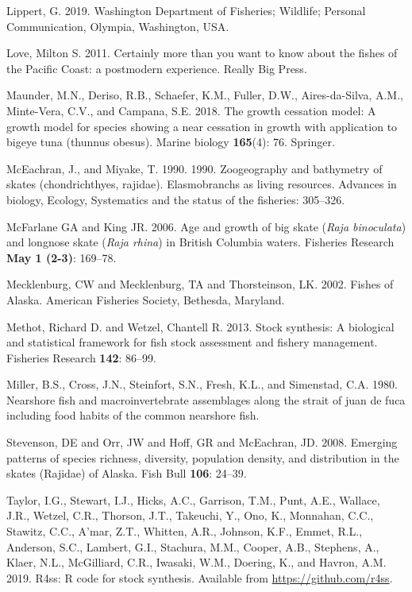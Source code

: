 \documentclass[12pt,]{article}
\begin{document}
\leavevmode\hypertarget{ref-GregLippert}{}%
Lippert, G. 2019. Washington Department of Fisheries; Wildlife; Personal
Communication, Olympia, Washington, USA.

\leavevmode\hypertarget{ref-Love2011}{}%
Love, Milton S. 2011. Certainly more than you want to know about the
fishes of the Pacific Coast: a postmodern experience. Really Big Press.

\leavevmode\hypertarget{ref-maunder2018growth}{}%
Maunder, M.N., Deriso, R.B., Schaefer, K.M., Fuller, D.W.,
Aires-da-Silva, A.M., Minte-Vera, C.V., and Campana, S.E. 2018. The
growth cessation model: A growth model for species showing a near
cessation in growth with application to bigeye tuna (thunnus obesus).
Marine biology \textbf{165}(4): 76. Springer.

\leavevmode\hypertarget{ref-McEachran1990}{}%
McEachran, J., and Miyake, T. 1990. 1990. Zoogeography and bathymetry of
skates (chondrichthyes, rajidae). Elasmobranchs as living resources.
Advances in biology, Ecology, Systematics and the status of the
fisheries: 305--326.

\leavevmode\hypertarget{ref-McFandKing2006}{}%
McFarlane GA and King JR. 2006. Age and growth of big skate (\emph{Raja
binoculata}) and longnose skate (\emph{Raja rhina}) in British Columbia
waters. Fisheries Research \textbf{May 1 (2-3)}: 169--78.

\leavevmode\hypertarget{ref-Mecklenburg2002}{}%
Mecklenburg, CW and Mecklenburg, TA and Thorsteinson, LK. 2002. Fishes
of Alaska. American Fisheries Society, Bethesda, Maryland.

\leavevmode\hypertarget{ref-Methot2013}{}%
Methot, Richard D. and Wetzel, Chantell R. 2013. Stock synthesis: A
biological and statistical framework for fish stock assessment and
fishery management. Fisheries Research \textbf{142}: 86--99.

\leavevmode\hypertarget{ref-Miller1980}{}%
Miller, B.S., Cross, J.N., Steinfort, S.N., Fresh, K.L., and Simenstad,
C.A. 1980. Nearshore fish and macroinvertebrate assemblages along the
strait of juan de fuca including food habits of the common nearshore
fish.

\leavevmode\hypertarget{ref-Stevenson2008}{}%
Stevenson, DE and Orr, JW and Hoff, GR and McEachran, JD. 2008. Emerging
patterns of species richness, diversity, population density, and
distribution in the skates (Rajidae) of Alaska. Fish Bull \textbf{106}:
24--39.

\leavevmode\hypertarget{ref-Taylor2019}{}%
Taylor, I.G., Stewart, I.J., Hicks, A.C., Garrison, T.M., Punt, A.E.,
Wallace, J.R., Wetzel, C.R., Thorson, J.T., Takeuchi, Y., Ono, K.,
Monnahan, C.C., Stawitz, C.C., A'mar, Z.T., Whitten, A.R., Johnson,
K.F., Emmet, R.L., Anderson, S.C., Lambert, G.I., Stachura, M.M.,
Cooper, A.B., Stephens, A., Klaer, N.L., McGilliard, C.R., Iwasaki,
W.M., Doering, K., and Havron, A.M. 2019. R4ss: R code for stock
synthesis. Available from \url{https://github.com/r4ss}.
\end{document}
